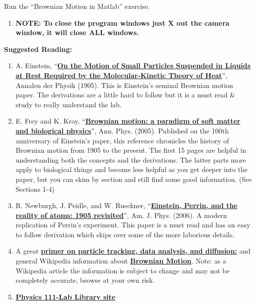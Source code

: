 \documentclass{../lab}
\begin{document}
Run the ``Brownian Motion in Matlab'' exercise.

\begin{enumerate}
    \item \textbf{NOTE: To close the program windows just X out the camera window, it will close ALL windows.}
\end{enumerate}

\textbf{Suggested Reading:}

\begin{enumerate}
    \item A. Einstein, ``\href{http://physics111.lib.berkeley.edu/Physics111/Reprints/BMC/Einstein\_Diffusion1905.pdf}{\textbf{On the Motion of Small Particles Suspended in Liquids at Rest Required by the Molecular-Kinetic Theory of Heat}}'', Annalen der Physik (1905). This is Einstein’s seminal Brownian motion paper. The derivations are a little hard to follow but it is a must read \& study to really understand the lab.

    \item E. Frey and K. Kroy, ``\href{http://physics111.lib.berkeley.edu/Physics111/Reprints/BMC/Brownian\%20Motion\%20-\%20Frey.pdf}{\textbf{Brownian motion: a paradigm of soft matter and biological physics}}'', Ann. Phys. (2005). Published on the 100th anniversary of Einstein’s paper, this reference chronicles the history of Brownian motion from 1905 to the present. The first 15 pages are helpful in understanding both the concepts and the derivations. The latter parts more apply to biological things and become less helpful as you get deeper into the paper, but you can skim by section and still find some good information. (See Sections 1-4)

    \item R. Newburgh, J. Peidle, and W. Rueckner, ``\href{http://physics111.lib.berkeley.edu/Physics111/Reprints/BMC/Newburgh-Einstein-Perrin1905_Revisited.pdf}{\textbf{Einstein, Perrin, and the reality of atoms: 1905 revisited}}'', Am. J. Phys. (2006). A modern replication of Perrin's experiment. This paper is a must read and has an easy to follow derivation which skips over some of the more laborious details.

    \item A great \href{http://www.physics.nyu.edu/grierlab/methods/methods.html}{\textbf{primer on particle tracking, data analysis, and diffusion:}} and general Wikipedia information about \href{http://en.wikipedia.org/wiki/Brownian\_motion}{\textbf{Brownian Motion}}. Note: as a Wikipedia article the information is subject to change and may not be completely accurate, browse at your own risk.

    \item \href{\LabReprints}{\textbf{Physics 111-Lab Library site}}
\end{enumerate}
\end{document}
